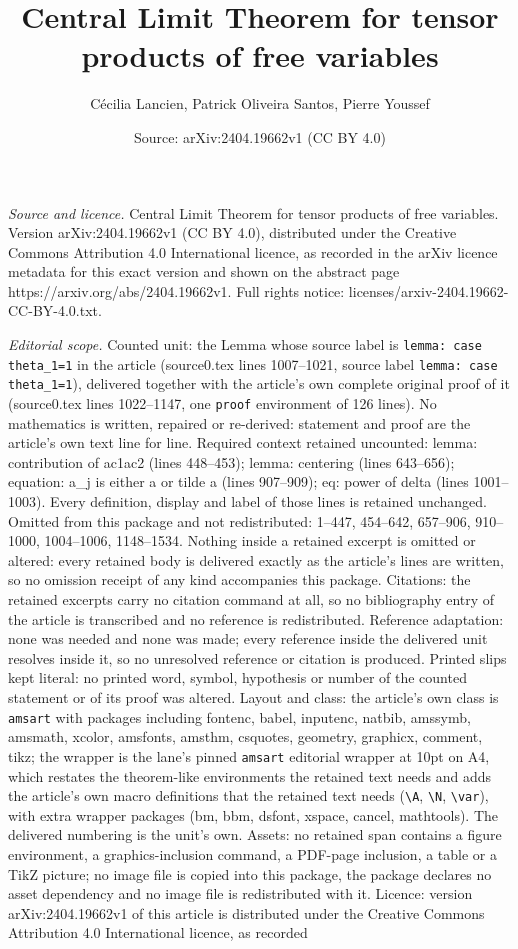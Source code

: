 \documentclass[10pt,a4paper]{amsart}
\title[Central Limit Theorem for tensor products of free variables]{Central Limit Theorem for tensor products of free variables}
\author{C\'ecilia Lancien, Patrick Oliveira Santos, Pierre Youssef}
\date{Source: arXiv:2404.19662v1 (CC BY 4.0)}
\begin{document}
\maketitle

\noindent\emph{Source and licence.} Central Limit Theorem for tensor products of free variables. Version arXiv:2404.19662v1 (CC BY 4.0), distributed under the Creative Commons Attribution 4.0 International licence, as recorded in the arXiv licence metadata for this exact version and shown on the abstract page https://arxiv.org/abs/2404.19662v1. Full rights notice: licenses/arxiv-2404.19662-CC-BY-4.0.txt.\par\smallskip

\noindent\textit{Editorial scope.} Counted unit: the Lemma whose source label is \texttt{lemma: case theta\_1=1} in the article (source0.tex lines 1007--1021, source label \texttt{lemma: case theta\_1=1}), delivered together with the article's own complete original proof of it (source0.tex lines 1022--1147, one \texttt{proof} environment of 126 lines). No mathematics is written, repaired or re-derived: statement and proof are the article's own text line for line. Required context retained uncounted: lemma: contribution of ac1ac2 (lines 448--453); lemma: centering (lines 643--656); equation: a\_j is either a or tilde a (lines 907--909); eq: power of delta (lines 1001--1003). Every definition, display and label of those lines is retained unchanged. Omitted from this package and not redistributed: 1--447, 454--642, 657--906, 910--1000, 1004--1006, 1148--1534. Nothing inside a retained excerpt is omitted or altered: every retained body is delivered exactly as the article's lines are written, so no omission receipt of any kind accompanies this package. Citations: the retained excerpts carry no citation command at all, so no bibliography entry of the article is transcribed and no reference is redistributed. Reference adaptation: none was needed and none was made; every reference inside the delivered unit resolves inside it, so no unresolved reference or citation is produced. Printed slips kept literal: no printed word, symbol, hypothesis or number of the counted statement or of its proof was altered. Layout and class: the article's own class is \texttt{amsart} with packages including fontenc, babel, inputenc, natbib, amssymb, amsmath, xcolor, amsfonts, amsthm, csquotes, geometry, graphicx, comment, tikz; the wrapper is the lane's pinned \texttt{amsart} editorial wrapper at 10pt on A4, which restates the theorem-like environments the retained text needs and adds the article's own macro definitions that the retained text needs (\texttt{\textbackslash A}, \texttt{\textbackslash N}, \texttt{\textbackslash var}), with extra wrapper packages (bm, bbm, dsfont, xspace, cancel, mathtools). The delivered numbering is the unit's own. Assets: no retained span contains a figure environment, a graphics-inclusion command, a PDF-page inclusion, a table or a TikZ picture; no image file is copied into this package, the package declares no asset dependency and no image file is redistributed with it. Licence: version arXiv:2404.19662v1 of this article is distributed under the Creative Commons Attribution 4.0 International licence, as recorded 
\end{document}
